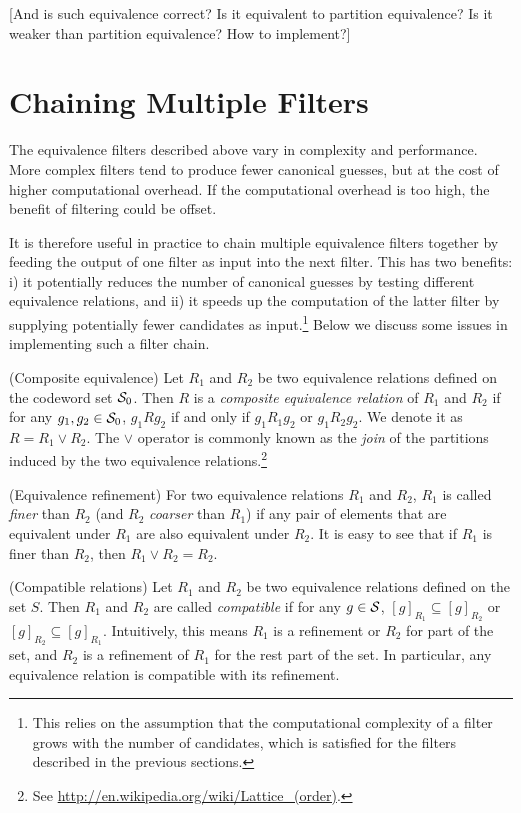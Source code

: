 [And is such equivalence correct? Is it equivalent to partition equivalence? Is it weaker than partition equivalence? How to implement?]

\section{Chaining Multiple Filters}

The equivalence filters described above vary in complexity and performance. More complex filters tend to produce fewer canonical guesses, but at the cost of higher computational overhead. If the computational overhead is too high, the benefit of filtering could be offset.

It is therefore useful in practice to chain multiple equivalence filters together by feeding the output of one filter as input into the next filter. This has two benefits: i) it potentially reduces the number of canonical guesses by testing different equivalence relations, and ii) it speeds up the computation of the latter filter by supplying potentially fewer candidates as input.\footnote{This relies on the assumption that the computational complexity of a filter grows with the number of candidates, which is satisfied for the filters described in the previous sections.}
Below we discuss some issues in implementing such a filter chain.

\begin{definition}
(Composite equivalence) Let $R_1$ and $R_2$ be two equivalence relations defined on the codeword set $\mathcal{S}_0$. Then $R$ is a \emph{composite equivalence relation} of $R_1$ and $R_2$ if for any $g_1, g_2 \in \mathcal{S}_0$, $g_1 R g_2$ if and only if $g_1 R_1 g_2$ or $g_1 R_2 g_2$. We denote it as $R = R_1 \vee R_2$. The $\vee$ operator is commonly known as the \emph{join} of the partitions induced by the two equivalence relations.\footnote{See \url{http://en.wikipedia.org/wiki/Lattice\_(order)}.}
\end{definition}

\begin{definition}
(Equivalence refinement) For two equivalence relations $R_1$ and $R_2$, $R_1$ is called \emph{finer} than $R_2$ (and $R_2$ \emph{coarser} than $R_1$) if any pair of elements that are equivalent under $R_1$ are also equivalent under $R_2$. It is easy to see that if $R_1$ is finer than $R_2$, then $R_1 \vee R_2 = R_2$.
\end{definition}

\begin{definition}
(Compatible relations) Let $R_1$ and $R_2$ be two equivalence relations defined on the set $S$. Then $R_1$ and $R_2$ are called \emph{compatible} if for any $g \in \mathcal{S}$, $[g]_{R_1} \subseteq [g]_{R_2}$ or $[g]_{R_2} \subseteq [g]_{R_1}$. Intuitively, this means $R_1$ is a refinement or $R_2$ for part of the set, and $R_2$ is a refinement of $R_1$ for the rest part of the set. In particular, any equivalence relation is compatible with its refinement.
\end{definition}

